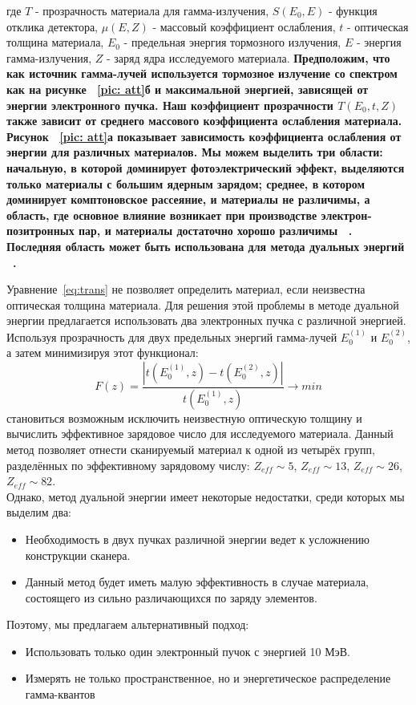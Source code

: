 \documentclass[a4paper]{panl}
\begin{document}
где $T$ -  прозрачность материала для гамма-излучения, $S(E_0, E)$ - функция отклика детектора, $\mu(E,Z)$ - массовый коэффициент ослабления, $t$ -  оптическая толщина материала, $E_0$ - предельная энергия тормозного излучения, $E$ - энергия гамма-излучения, $Z$ - заряд ядра исследуемого материала.
\textbf{Предположим, что как источник гамма-лучей  используется тормозное излучение со спектром как на рисунке ~\ref{pic: att}б и максимальной энергией, зависящей от энергии электронного пучка. Наш коэффициент прозрачности  $T(E_0, t, Z)$ также зависит от среднего массового коэффициента ослабления материала. Рисунок ~\ref{pic: att}а показывает зависимость коэффициента ослабления от энергии для различных материалов. Мы можем выделить три области: начальную, в которой доминирует фотоэлектрический эффект, выделяются только материалы с большим ядерным зарядом; среднее, в котором доминирует комптоновское рассеяние, и материалы не различимы, а область, где основное влияние возникает при производстве электрон-позитронных пар, и материалы достаточно хорошо различимы ~\cite{heitler1984quantum, ALLISON2016186, spirin}. Последняя область может быть использована для метода дуальных энергий ~\cite {spirin}.}

Уравнение~\ref{eq:trans} не позволяет определить материал, если неизвестна оптическая толщина материала. Для решения этой проблемы в методе дуальной энергии предлагается использовать два электронных пучка с различной энергией. Используя прозрачность для двух предельных энергий гамма-лучей $ E ^ {(1)} _0 $ и $ E ^ {(2)} _ 0 $, а затем минимизируя этот функционал:
\begin{equation}
F(z) = \frac{|t(E^{(1)}_0,z) - t(E^{(2)}_0,z)|}{t(E^{(1)}_0,z)} \to min
\end{equation}
становиться возможным исключить неизвестную оптическую толщину и вычислить эффективное зарядовое число для исследуемого материала. Данный метод позволяет отнести сканируемый материал к одной из четырёх групп, разделённых по эффективному зарядовому числу: $Z_{eff} \sim 5$, $Z_{eff} \sim 13$, $Z_{eff} \sim 26$, $Z_{eff} \sim 82$.\\
Однако, метод дуальной энергии имеет некоторые недостатки, среди которых мы выделим два:
    \begin{itemize}
        \item Необходимость в двух пучках различной энергии ведет к усложнению конструкции сканера.
        \item Данный метод будет иметь малую эффективность в случае материала, состоящего из сильно различающихся по заряду элементов.
    \end{itemize}
Поэтому, мы предлагаем альтернативный подход:
    \begin{itemize}
        \item Использовать только один электронный пучок с энергией 10 МэВ.
        \item Измерять не только пространственное, но и энергетическое распределение гамма-квантов 
    \end{itemize}
\end{document}
